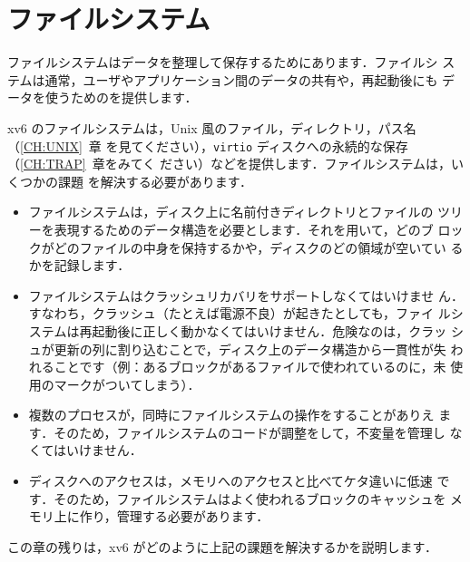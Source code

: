 \chapter{ファイルシステム}
\label{CH:FS}
% 
% 
% 	
% 

ファイルシステムはデータを整理して保存するためにあります．ファイルシ
ステムは通常，ユーザやアプリケーション間のデータの共有や，再起動後にも
データを使うためのを提供します．

xv6 のファイルシステムは，Unix 風のファイル，ディレクトリ，パス名（\ref{CH:UNIX}~章
を見てください），\texttt{virtio} ディスクへの永続的な保存（\ref{CH:TRAP}~章をみてく
ださい）などを提供します．ファイルシステムは，いくつかの課題
を解決する必要があります．
\begin{itemize}
\item ファイルシステムは，ディスク上に名前付きディレクトリとファイルの
  ツリーを表現するためのデータ構造を必要とします．それを用いて，どのブ
  ロックがどのファイルの中身を保持するかや，ディスクのどの領域が空いてい
  るかを記録します．

\item ファイルシステムはクラッシュリカバリをサポートしなくてはいけませ
  ん．すなわち，クラッシュ（たとえば電源不良）が起きたとしても，ファイ
  ルシステムは再起動後に正しく動かなくてはいけません．危険なのは，クラッ
  シュが更新の列に割り込むことで，ディスク上のデータ構造から一貫性が失
  われることです（例：あるブロックがあるファイルで使われているのに，未
  使用のマークがついてしまう）．

\item 複数のプロセスが，同時にファイルシステムの操作をすることがありえ
  ます．そのため，ファイルシステムのコードが調整をして，不変量を管理し
  なくてはいけません．

\item ディスクへのアクセスは，メモリへのアクセスと比べてケタ違いに低速
  です．そのため，ファイルシステムはよく使われるブロックのキャッシュを
  メモリ上に作り，管理する必要があります．
\end{itemize}

この章の残りは，xv6 がどのように上記の課題を解決するかを説明します．

